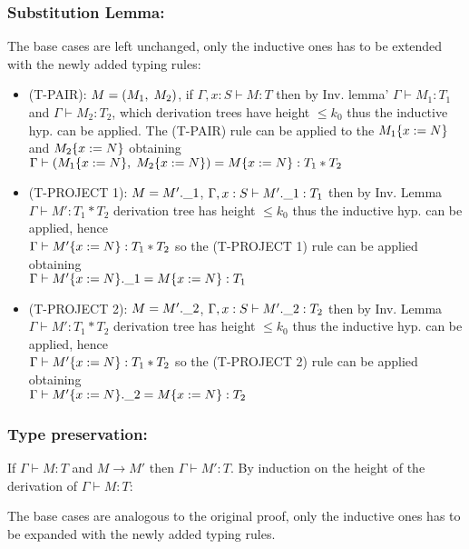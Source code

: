 \subsubsection*{Substitution Lemma:}

The base cases are left unchanged, only the inductive ones has to be
extended with the newly added typing rules:
\begin{itemize}
\item (T-PAIR): $M = (M_1,\;M_2)$, if $\Gamma, x: S \vdash M: T$
  then by Inv. lemma' $\Gamma \vdash M_1: T_1$ and $\Gamma \vdash M_2:
  T_2$, which derivation trees have height $\le k_0$ thus the
  inductive hyp. can be applied. The (T-PAIR) rule can be applied to
  the $M_1\{x:=N\}$ and $M_2\{x:=N\}$ obtaining\\ $\Gamma
  \vdash (M_1\{x:=N\},\;M_2\{x:=N\}) = M\{x:=N\} : T_1
  * T_2$
\item (T-PROJECT 1): $M = M'.\_1$, $\Gamma, x:S \vdash M'.\_1 :
  T_1$ then by Inv. Lemma $\Gamma \vdash M' : T_1 \ast T_2$ derivation
  tree has height $\le k_0$ thus the inductive hyp. can be applied,
  hence\\ $\Gamma \vdash M'\{x:=N\}: T_1 \ast T_2$ so the
  (T-PROJECT 1) rule can be applied obtaining\\ $\Gamma \vdash
  M'\{x:=N\}.\_1 = M\{x:=N\}: T_1$
\item (T-PROJECT 2): $M = M'.\_2$, $\Gamma, x:S \vdash M'.\_2 :
  T_2$ then by Inv. Lemma $\Gamma \vdash M' : T_1 \ast T_2$ derivation
  tree has height $\le k_0$ thus the inductive hyp. can be applied,
  hence\\ $\Gamma \vdash M'\{x:=N\}: T_1 \ast T_2$ so the
  (T-PROJECT 2) rule can be applied obtaining\\ $\Gamma \vdash
  M'\{x:=N\}.\_2 = M\{x:=N\}: T_2$
\end{itemize}

\subsubsection*{Type preservation:}
If $\Gamma \vdash M: T$ and $M \to M'$ then $\Gamma \vdash M': T$. By
induction on the height of the derivation of $\Gamma \vdash M: T$:

The base cases are analogous to the original proof, only the inductive
ones has to be expanded with the newly added typing rules.

